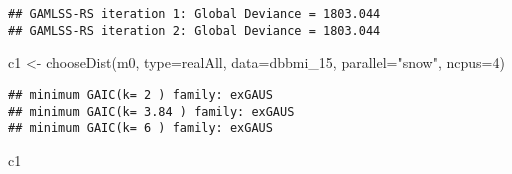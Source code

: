 \documentclass[
]{article}
\newenvironment{Shaded}{\begin{snugshade}}{\end{snugshade}}
\newcommand{\AttributeTok}[1]{\textcolor[rgb]{0.77,0.63,0.00}{#1}}
\newcommand{\DecValTok}[1]{\textcolor[rgb]{0.00,0.00,0.81}{#1}}
\newcommand{\FunctionTok}[1]{\textcolor[rgb]{0.00,0.00,0.00}{#1}}
\newcommand{\NormalTok}[1]{#1}
\newcommand{\OtherTok}[1]{\textcolor[rgb]{0.56,0.35,0.01}{#1}}
\newcommand{\StringTok}[1]{\textcolor[rgb]{0.31,0.60,0.02}{#1}}
\begin{document}
\begin{verbatim}
## GAMLSS-RS iteration 1: Global Deviance = 1803.044 
## GAMLSS-RS iteration 2: Global Deviance = 1803.044
\end{verbatim}

\begin{Shaded}
\begin{Highlighting}[]
\NormalTok{c1 }\OtherTok{\textless{}{-}} \FunctionTok{chooseDist}\NormalTok{(m0, }\AttributeTok{type=}\StringTok{\textquotesingle{}realAll\textquotesingle{}}\NormalTok{, }\AttributeTok{data=}\NormalTok{dbbmi\_15, }\AttributeTok{parallel=}\StringTok{"snow"}\NormalTok{, }\AttributeTok{ncpus=}\DecValTok{4}\NormalTok{)}
\end{Highlighting}
\end{Shaded}

\begin{verbatim}
## minimum GAIC(k= 2 ) family: exGAUS 
## minimum GAIC(k= 3.84 ) family: exGAUS 
## minimum GAIC(k= 6 ) family: exGAUS
\end{verbatim}

\begin{Shaded}
\begin{Highlighting}[]
\NormalTok{c1}
\end{Highlighting}
\end{Shaded}
\end{document}
